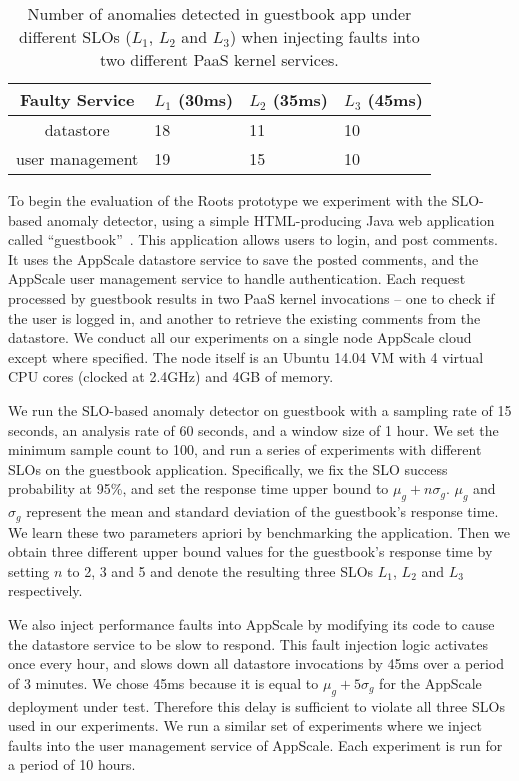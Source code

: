 \begin{table}
\begin{center}
\begin{tabular}{|c|p{1cm}|p{1cm}|p{1cm}|}
\hline
Faulty Service & $L_1$ (30ms) & $L_2$ (35ms) & $L_3$ (45ms) \\ \hline
datastore & 18 & 11 & 10 \\ \hline
user management & 19 & 15 & 10 \\ \hline
\end{tabular}
\end{center}
\caption{Number of anomalies detected in guestbook app under different SLOs 
($L_1$, $L_2$ and $L_3$) when injecting faults into two different PaaS kernel services.
\label{tab:anomaly_counts}
}
\end{table}

To begin the evaluation of the Roots prototype we experiment with
the SLO-based anomaly detector, using a simple HTML-producing Java 
web application called ``guestbook''~\cite{XXX}.
This application allows users to login, and post comments. It uses the
AppScale  datastore service to save
the posted comments, and the AppScale user management service to handle authentication. Each request processed
by guestbook results in two PaaS kernel invocations -- one to check if the user is logged in, and 
another to retrieve the existing comments from the datastore. We conduct all
our experiments on a single node AppScale cloud except where specified. The node itself is an Ubuntu
14.04 VM with 4 virtual CPU cores (clocked at 2.4GHz) and 4GB of memory.

We run the SLO-based anomaly detector on guestbook with a sampling rate of 15 seconds, an analysis
rate of 60 seconds, and a window size of 1 hour. We set the minimum sample count to 100, and
run a series of experiments with different SLOs on the guestbook application. Specifically, we fix
the SLO success probability at 95\%, and set the response time upper bound to $\mu_g + n\sigma_g$. 
$\mu_g$ and $\sigma_g$ represent the mean and standard deviation of the
guestbook's response time. We learn these two parameters apriori by benchmarking
the application. Then we obtain three different upper bound values for the guestbook's
response time by setting 
$n$ to 2, 3 and 5 and denote the resulting three SLOs $L_1$, $L_2$ and $L_3$ respectively.

We also inject performance faults into AppScale by modifying its code
to cause the datastore service to be slow to respond.
This fault injection logic activates once every hour, and
slows down all datastore invocations by 45ms over a period of 3 minutes.
We chose 45ms because it is equal 
to $\mu_g + 5\sigma_g$ for the AppScale deployment under test. 
Therefore this delay is sufficient to violate all three SLOs used in our experiments. 
We run a similar set of experiments where we inject faults into the user management service of
AppScale. Each experiment is run for a period of 10 hours.

